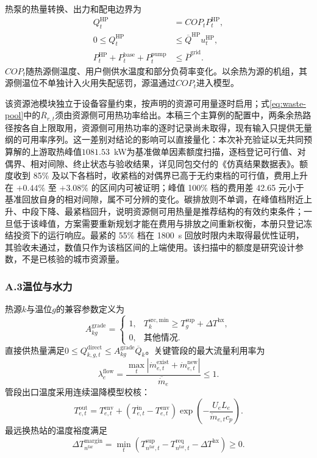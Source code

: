 热泵的热量转换、出力和配电边界为
\begin{align}
Q_t^{\mathrm{HP}}&=COP_tP_t^{\mathrm{HP}},\\
0\leq Q_t^{\mathrm{HP}}&\leq\overline Q^{\mathrm{HP}}u_t^{\mathrm{HP}},\\
P_t^{\mathrm{HP}}+P_t^{\mathrm{base}}+P_t^{\mathrm{pump}}&\leq\overline P^{\mathrm{grid}}.
\end{align}
$COP_t$随热源侧温度、用户侧供水温度和部分负荷率变化。以余热为源的机组，其源侧温位不单独计入火用失配惩罚，源温通过$COP_t$进入模型。

该资源池模块独立于设备容量约束，按声明的资源可用量逐时启用；式\eqref{eq:waste-pool}中的$\overline R_{r,t}$须由资源侧可用热功率给出。本稿三个主算例的配置中，两条余热路径按各自上限取用，资源侧可用热功率的逐时记录尚未取得，现有输入只提供无量纲的可用率序列。这一差别对结论的影响可以直接量化：本次补充验证以无共同预算解的上游取热峰值$1081.53$~kW为基准做单因素额度扫描，逐档登记可行值、对偶界、相对间隙、终止状态与验收结果，详见同包交付的《仿真结果数据表》。额度收到 85\% 及以下各档时，收紧档的对偶界已高于无约束档的可行值，费用上升在 $+0.44\%$ 至 $+3.08\%$ 的区间内可被证明；峰值 100\% 档的费用差 42.65 元小于基准回放自身的相对间隙，属不可分辨的变化。碳排放则不单调，在峰值档附近上升、中段下降、最紧档回升，说明资源侧可用热量是推荐结构的有效约束条件；一旦低于该峰值，方案需要重新规划才能在费用与排放之间重新权衡，本册只登记冻结投资下的运行响应。最紧的 55\% 档在 1800~s 回放时限内未取得最优性证明，其验收未通过，数值只作为该档区间的上端使用。该扫描中的额度是研究设计参数，不是已核验的城市资源量。

\subsubsection*{A.3\quad 温位与水力}

热源$k$与温位$g$的兼容参数定义为
\begin{equation}
A_{kg}^{\mathrm{grade}}=
\begin{cases}
1,&T_k^{\mathrm{src,min}}\geq T_g^{\mathrm{sup}}+\Delta T^{\mathrm{hx}},\\
0,&\text{其他情况}.
\end{cases}
\end{equation}
直接供热量满足$0\leq Q_{k,g,t}^{\mathrm{direct}}\leq A_{kg}^{\mathrm{grade}}\overline Q_k$。关键管段的最大流量利用率为
\begin{equation}
\lambda_e^{\mathrm{flow}}=
\frac{\max_t|\dot m_{e,t}^{\mathrm{exist}}+\dot m_{e,t}^{\mathrm{new}}|}{\overline{\dot m}_e}\leq1.
\end{equation}
管段出口温度采用连续温降模型校核：
\begin{equation}
T_{e,t}^{\mathrm{out}}=T_{e,t}^{\mathrm{env}}+
(T_{e,t}^{\mathrm{in}}-T_{e,t}^{\mathrm{env}})
\exp\left(-\frac{U_eL_e}{\dot m_{e,t}c_p}\right).
\end{equation}
最远换热站的温度裕度满足
\begin{equation}
\Delta T_{n^{\mathrm{far}}}^{\mathrm{margin}}=
\min_t\left(T_{n^{\mathrm{far}},t}^{\mathrm{sup}}-T_{n^{\mathrm{far}},t}^{\mathrm{req}}-\Delta T^{\mathrm{hx}}\right)\geq0.
\end{equation}

